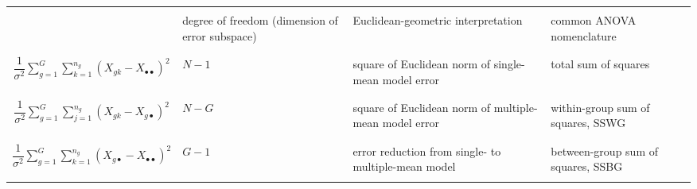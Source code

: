 \begin{remark}
\begin{center}
\begin{tabular}{|c|p{2.5cm}|p{2.5cm}|p{2.5cm}|}
\hline
&&&\\
& degree of freedom (dimension of error subspace) & Euclidean-geometric interpretation & common ANOVA nomenclature \\
&&&\\
\hline\hline
&&&\\
$\dfrac{1}{\sigma^{2}}\sum_{g=1}^{G}\sum_{k=1}^{n_{g}}\left(X_{gk} - X_{\bullet\bullet}\right)^{2}$ & $N - 1$ & square of Euclidean norm of single-mean model error & total sum of squares \\
&&&\\
\hline
&&&\\
$\dfrac{1}{\sigma^{2}}\sum_{g=1}^{G}\sum_{j=1}^{n_{g}}\left(X_{gk}-X_{g\bullet}\right)^{2}$ & $N - G$ & square of Euclidean norm of multiple-mean model error & within-group sum of squares, SSWG \\
&&&\\
\hline
&&&\\
$\dfrac{1}{\sigma^{2}}\sum_{g=1}^{G} \sum_{k=1}^{n_{g}} \left(X_{g\bullet} - X_{\bullet\bullet}\right)^{2}$ & $G - 1$ & error reduction from single- to multiple-mean model & between-group sum of squares, SSBG \\
&&&\\
\hline
\end{tabular}
\end{center}
\end{remark}
